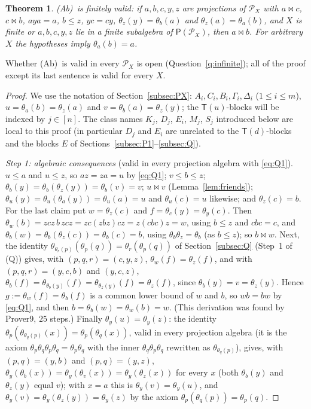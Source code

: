 \documentclass[11pt]{amsart}
\newtheorem{theorem}{Theorem}[section]
\theoremstyle{definition}
\renewcommand{\P}{\mathcal{P}}      %
\newcommand{\PA}{\mathsf{P}}         %
\newcommand{\T}{\mathsf{T}}
\newcommand{\mt}{\bowtie}      %
\newcommand{\Qcond}{\textup{(Q)}}
\newcommand{\Kfour}{\textup{(Ab)}}     %
\begin{document}
\begin{theorem}\label{thm:K4}
\Kfour\ is finitely valid: if $a,b,c,y,z$ are projections of $\P_X$ with $a\mt c$, $c\mt b$, $aya=a$, $b\le z$, $yc=cy$, $\theta_z(y)=\theta_b(a)$ and $\theta_z(a)=\theta_a(b)$, and $X$ is finite or $a,b,c,y,z$ lie in a finite subalgebra of $\PA(\P_X)$, then $a\mt b$. For arbitrary $X$ the hypotheses imply $\theta_a(b)=a$.
\end{theorem}

Whether \Kfour\ is valid in every $\P_X$ is open (Question~\ref{q:infinite}); all of the proof except its last sentence is valid for every $X$.

\begin{proof}
We use the notation of Section~\ref{subsec:PX}: $A_i,C_i,B_i,\Gamma_i,\Delta_i$ ($1\le i\le m$), $u=\theta_a(b)=\theta_z(a)$ and $v=\theta_b(a)=\theta_z(y)$; the $\T(u)$-blocks will be indexed by $j\in[n]$. The class names $K_j$, $D_j$, $E_i$, $M_j$, $S_j$ introduced below are local to this proof (in particular $D_j$ and $E_i$ are unrelated to the $\T(d)$-blocks and the blocks $E$ of Sections~\ref{subsec:P1}--\ref{subsec:Q}).

\smallskip\emph{Step 1: algebraic consequences} (valid in every projection algebra with \eqref{eq:Q1}). $u\le a$ and $u\le z$, so $az=za=u$ by \eqref{eq:Q1}; $v\le b\le z$; $\theta_b(y)=\theta_b(\theta_z(y))=\theta_b(v)=v$; $u\mt v$ (Lemma~\ref{lem:friends}); $\theta_u(y)=\theta_u(\theta_a(y))=\theta_u(a)=u$ and $\theta_u(c)=u$ likewise; and $\theta_z(c)=b$. For the last claim put $w=\theta_z(c)$ and $f=\theta_c(y)=\theta_y(c)$. Then $\theta_w(b)=zcz\,b\,zcz=zc(zbz)cz=z(cbc)z=w$, using $b\le z$ and $cbc=c$, and $\theta_b(w)=\theta_b(\theta_z(c))=\theta_b(c)=b$, using $\theta_b\theta_z=\theta_b$ (as $b\le z$); so $b\mt w$. Next, the identity $\theta_{\theta_r(p)}(\theta_p(q))=\theta_r(\theta_p(q))$ of Section~\ref{subsec:Q} (Step~1 of \Qcond) gives, with $(p,q,r)=(c,y,z)$, $\theta_w(f)=\theta_z(f)$, and with $(p,q,r)=(y,c,b)$ and $(y,c,z)$, $\theta_b(f)=\theta_{\theta_b(y)}(f)=\theta_{\theta_z(y)}(f)=\theta_z(f)$, since $\theta_b(y)=v=\theta_z(y)$. Hence $g:=\theta_w(f)=\theta_b(f)$ is a common lower bound of $w$ and $b$, so $wb=bw$ by \eqref{eq:Q1}, and then $b=\theta_b(w)=\theta_w(b)=w$. (This derivation was found by Prover9, $25$ steps.) Finally $\theta_y(u)=\theta_y(z)$: the identity $\theta_p(\theta_{\theta_q(p)}(x))=\theta_p(\theta_q(x))$, valid in every projection algebra (it is the axiom $\theta_p\theta_q\theta_p\theta_q=\theta_p\theta_q$ with the inner $\theta_q\theta_p\theta_q$ rewritten as $\theta_{\theta_q(p)}$), gives, with $(p,q)=(y,b)$ and $(p,q)=(y,z)$, $\theta_y(\theta_b(x))=\theta_y(\theta_v(x))=\theta_y(\theta_z(x))$ for every $x$ (both $\theta_b(y)$ and $\theta_z(y)$ equal $v$); with $x=a$ this is $\theta_y(v)=\theta_y(u)$, and $\theta_y(v)=\theta_y(\theta_z(y))=\theta_y(z)$ by the axiom $\theta_p(\theta_q(p))=\theta_p(q)$.


\end{proof}
\end{document}
